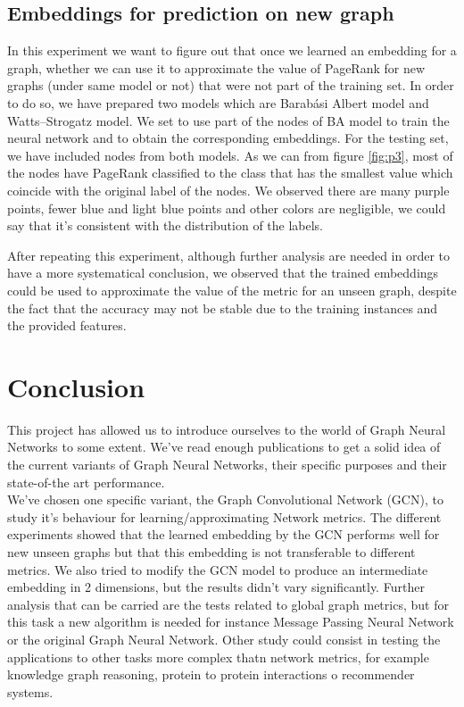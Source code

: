 \documentclass[a4paper]{article}
\begin{document}
\subsection{Embeddings for prediction on new graph}
In this experiment we want to figure out that once we learned an embedding for a graph, whether we can use it to approximate the value of PageRank for new graphs (under same model or not) that were not part of the training set. In order to do so, we have prepared two models which are Barabási Albert model and Watts–Strogatz model. We set to use part of the nodes of BA model to train the neural network and to obtain the corresponding embeddings. For the testing set, we have included nodes from both models. As we can from figure \ref{fig:p3}, most of the nodes have PageRank classified to the class that has the smallest value which coincide with the original label of the nodes. We observed there are many purple points, fewer blue and light blue points and other colors are negligible, we could say that it's consistent with the distribution of the labels.

After repeating this experiment, although further analysis are needed in order to have a more systematical conclusion, we observed that the trained embeddings could be used to approximate the value of the metric for an unseen graph, despite the fact that the accuracy may not be stable due to the training instances and the provided features.  



\section{Conclusion} \label{conclu}

This project has allowed us to introduce ourselves to the world of Graph Neural Networks to some extent. We've read enough publications to get a solid idea of the current variants of Graph Neural Networks, their specific purposes and their state-of-the art performance.\\
We've chosen one specific variant, the Graph Convolutional Network (GCN), to study it's behaviour for learning/approximating Network metrics. The different experiments showed that the learned embedding by the GCN performs well for new unseen graphs but that this embedding is not transferable to different metrics. We also tried to modify the GCN model to produce an intermediate embedding in 2 dimensions, but the results didn't vary significantly.
Further analysis that can be carried are the tests related to global graph metrics, but for this task a new algorithm is needed for instance Message Passing Neural Network or the original Graph Neural Network. Other study could consist in testing the applications to other tasks more complex thatn network metrics, for example knowledge graph reasoning, protein to protein interactions o recommender systems.



\nocite{*}
 
\end{document}
